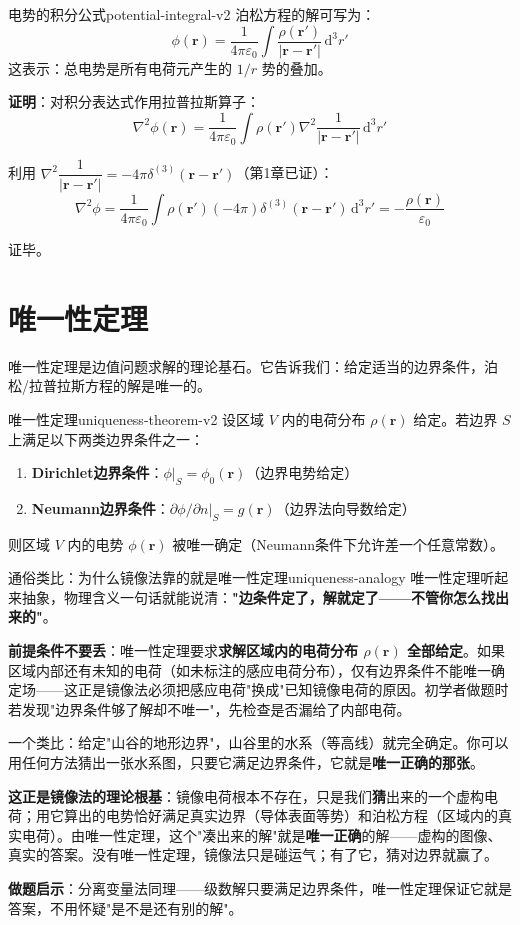 \documentclass[11pt,a4paper,openany,oneside]{book}
\newcommand{\diff}{\mathrm{d}}
\newcommand{\eps}{\varepsilon}
\newcommand{\vect}[1]{\bm{#1}}
\newcommand{\lap}{\nabla^2}
\begin{document}
\begin{theorem}{电势的积分公式}{potential-integral-v2}
泊松方程的解可写为：
\[
\phi(\vect{r}) = \frac{1}{4\pi\eps_0} \int \frac{\rho(\vect{r}')}{|\vect{r} - \vect{r}'|} \, \diff^3r'
\]
这表示：总电势是所有电荷元产生的 $1/r$ 势的叠加。
\end{theorem}

\textbf{证明}：对积分表达式作用拉普拉斯算子：
\[
\lap\phi(\vect{r}) = \frac{1}{4\pi\eps_0} \int \rho(\vect{r}') \lap\frac{1}{|\vect{r} - \vect{r}'|} \, \diff^3r'
\]

利用 $\lap\dfrac{1}{|\vect{r} - \vect{r}'|} = -4\pi\delta^{(3)}(\vect{r} - \vect{r}')$（第1章已证）：
\[
\lap\phi = \frac{1}{4\pi\eps_0} \int \rho(\vect{r}') (-4\pi) \delta^{(3)}(\vect{r} - \vect{r}') \, \diff^3r' = -\frac{\rho(\vect{r})}{\eps_0}
\]

证毕。

\section{唯一性定理}

唯一性定理是边值问题求解的理论基石。它告诉我们：给定适当的边界条件，泊松/拉普拉斯方程的解是唯一的。

\begin{theorem}{唯一性定理}{uniqueness-theorem-v2}
设区域 $V$ 内的电荷分布 $\rho(\vect{r})$ 给定。若边界 $S$ 上满足以下两类边界条件之一：
\begin{enumerate}
\item \textbf{Dirichlet边界条件}：$\phi|_S = \phi_0(\vect{r})$（边界电势给定）
\item \textbf{Neumann边界条件}：$\partial\phi/\partial n|_S = g(\vect{r})$（边界法向导数给定）
\end{enumerate}
则区域 $V$ 内的电势 $\phi(\vect{r})$ 被唯一确定（Neumann条件下允许差一个任意常数）。
\end{theorem}

\begin{tip}{通俗类比：为什么镜像法靠的就是唯一性定理}{uniqueness-analogy}
唯一性定理听起来抽象，物理含义一句话就能说清：\textbf{"边条件定了，解就定了——不管你怎么找出来的"}。

\textbf{前提条件不要丢}：唯一性定理要求\textbf{求解区域内的电荷分布 $\rho(\vect{r})$ 全部给定}。如果区域内部还有未知的电荷（如未标注的感应电荷分布），仅有边界条件不能唯一确定场——这正是镜像法必须把感应电荷"换成"已知镜像电荷的原因。初学者做题时若发现"边界条件够了解却不唯一"，先检查是否漏给了内部电荷。

一个类比：给定"山谷的地形边界"，山谷里的水系（等高线）就完全确定。你可以用任何方法猜出一张水系图，只要它满足边界条件，它就是\textbf{唯一正确的那张}。

\textbf{这正是镜像法的理论根基}：镜像电荷根本不存在，只是我们\textbf{猜}出来的一个虚构电荷；用它算出的电势恰好满足真实边界（导体表面等势）和泊松方程（区域内的真实电荷）。由唯一性定理，这个"凑出来的解"就是\textbf{唯一正确}的解——虚构的图像、真实的答案。没有唯一性定理，镜像法只是碰运气；有了它，猜对边界就赢了。

\textbf{做题启示}：分离变量法同理——级数解只要满足边界条件，唯一性定理保证它就是答案，不用怀疑"是不是还有别的解"。
\end{tip}
\end{document}
